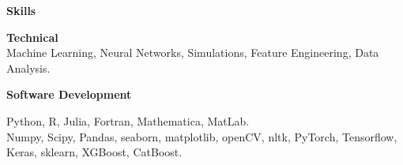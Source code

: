 \documentclass[a4paper,12pt,final]{memoir}
\newcommand{\SmallSep}{\vspace{0.5em}}
\newcommand{\CVSection}[1]
	{\Large\textbf{#1}\par
	\SmallSep\normalsize\normalfont}
\newcommand{\CVItem}[1]
	{\textbf{\color{RoyalBlue} #1}}
\begin{document}
\CVSection{Skills}


\CVItem{Technical}\\
{\small Machine Learning, Neural Networks, Simulations, Feature Engineering, Data Analysis.\\}
\vspace{-10pt}
\SmallSep

\CVItem{Software Development}\\
\begin{small}
Python, R, Julia, Fortran, Mathematica, MatLab.\\
Numpy, Scipy, Pandas, seaborn, matplotlib, openCV, nltk, PyTorch, Tensorflow, Keras, sklearn, XGBoost, CatBoost.\\
\end{small}





\end{document}
